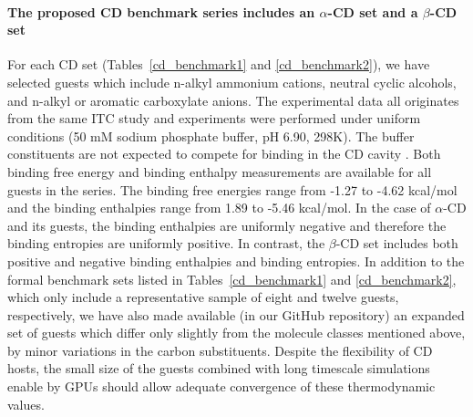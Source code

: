 \documentclass[aps,pre,twocolumn,nofootinbib,superscriptaddress,10pt, final,tightenlines]{revtex4-1}
\begin{document}
\paragraph{The proposed CD benchmark series includes an $\alpha$-CD set and a $\beta$-CD set}
For each CD set (Tables~\ref{cd_benchmark1} and \ref{cd_benchmark2}), we have selected guests which include n-alkyl ammonium cations, neutral cyclic alcohols, and n-alkyl or aromatic carboxylate anions.
The experimental data all originates from the same ITC study \cite{rekharsky_thermodynamic_1997} and experiments were performed under uniform conditions (50 mM sodium phosphate buffer, pH 6.90, 298K). 
The buffer constituents are not expected to compete for binding in the CD cavity \cite{rekharsky_thermodynamic_1995}.
Both binding free energy and binding enthalpy measurements are available for all guests in the series.
The binding free energies range from -1.27 to -4.62 kcal/mol and the binding enthalpies range from 1.89 to -5.46 kcal/mol. 
In the case of $\alpha$-CD and its guests, the binding enthalpies are uniformly negative and therefore the binding entropies are uniformly positive. 
In contrast, the $\beta$-CD set includes both positive and negative binding enthalpies and binding entropies.
In addition to the formal benchmark sets listed in Tables~\ref{cd_benchmark1} and \ref{cd_benchmark2}, which only include a representative sample of eight and twelve guests, respectively, we have also made available (in our GitHub repository) an expanded set of guests which differ only slightly from the molecule classes mentioned above, by minor variations in the carbon substituents.
Despite the flexibility of CD hosts, the small size of the guests combined with long timescale simulations enable by GPUs should allow adequate convergence of these thermodynamic values.
\end{document}
